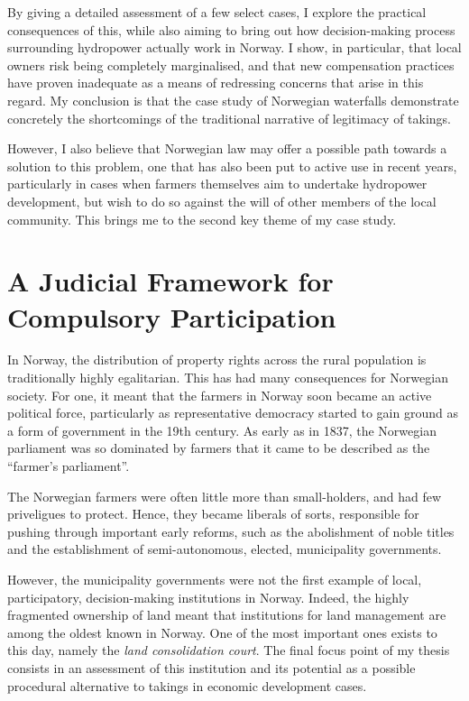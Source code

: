 By giving a detailed assessment of a few select cases, I explore the practical consequences of this, while also aiming to bring out how decision-making process surrounding hydropower actually work in Norway. I show, in particular, that local owners risk being completely marginalised, and that new compensation practices have proven inadequate as a means of redressing concerns that arise in this regard. My conclusion is that the case study of Norwegian waterfalls demonstrate concretely the shortcomings of the traditional narrative of legitimacy of takings.

However, I also believe that Norwegian law may offer a possible path towards a solution to this problem, one that has also been put to active use in recent years, particularly in cases when farmers themselves aim to undertake hydropower development, but wish to do so against the will of other members of the local community. This brings me to the second key theme of my case study.

\section{A Judicial Framework for Compulsory Participation}

In Norway, the distribution of property rights across the rural population is traditionally highly egalitarian. This has had many consequences for Norwegian society. For one, it meant that the farmers in Norway soon became an active political force, particularly as representative democracy started to gain ground as a form of government in the 19th century. As early as in 1837, the Norwegian parliament was so dominated by farmers that it came to be described as the ``farmer's parliament''.

The Norwegian farmers were often little more than small-holders, and had few priveligues to protect. Hence, they became liberals of sorts, responsible for pushing through important early reforms, such as the abolishment of noble titles and the establishment of semi-autonomous, elected, municipality governments. 

However, the municipality governments were not the first example of local, participatory, decision-making institutions in Norway. Indeed, the highly fragmented ownership of land meant that institutions for land management are among the oldest known in Norway. One of the most important ones exists to this day, namely the {\it land consolidation court}. The final focus point of my thesis consists in an assessment of this institution and its potential as a possible procedural alternative to takings in economic development cases.

